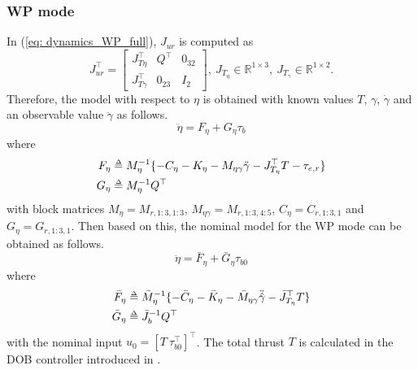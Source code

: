 \documentclass[letterpaper, 10 pt, conference]{ieeeconf}  %
\def\delequal{\mathrel{\ensurestackMath{\stackon[1pt]{=}{\scriptscriptstyle\Delta}}}}
\theoremstyle{definition}
\begin{document}
\subsubsection{WP mode}
In (\ref{eq: dynamics_WP_full}), $J_{u r}$ is computed as
\begin{equation}
    J_{u r}^{\top} = \begin{bmatrix} J_{T \eta}^{\top} & Q^{\top} & 0_{3 2} \\ J_{T \gamma}^{\top} & 0_{2 3} & I_2 \end{bmatrix}, \ J_{T_{\eta}} \in \mathbb{R}^{1 \times 3}, \ J_{T_{\gamma}} \in \mathbb{R}^{1 \times 2}.
\end{equation}
Therefore, the model with respect to $\eta$ is obtained with {known values $T$, $\gamma$, $\dot{\gamma}$ and an observable value $\ddot{\gamma}$} as follows.
\begin{equation} \label{eq: actual model of WP mode}
    \ddot{\eta} = F_{\eta} + G_{\eta}\tau_b
\end{equation}
where
\begin{equation*}
\begin{split}
    F_{\eta} &\delequal M^{-1}_{\eta}\{ -C_{\eta} - K_{\eta} - M_{\eta \gamma}\ddot{\gamma} - J^{\top}_{T_{\eta}}T - \tau_{e,r} \} \\
    G_{\eta} &\delequal M^{-1}_{\eta}Q^{\top}
\end{split}
\end{equation*}
with block matrices $M_{\eta} = M_{r,1:3,1:3}$, $M_{\eta \gamma} = M_{r,1:3,4:5}$, $C_{\eta} = C_{r, 1:3,1}$ and $G_{\eta} = G_{r, 1:3, 1}$.
Then based on this, the nominal model for the WP mode can be obtained as follows.
\begin{equation} \label{eq: nominal dynamics of WP mode}
    \ddot{\eta} = \bar{F}_{\eta} + \bar{G}_{\eta}\tau_{b 0}
\end{equation}
where
\begin{equation} \label{eq: definition of F_eta and G_eta}
    \begin{split}
        \bar{F}_{\eta} &\delequal \bar{M}^{-1}_{\eta}\{ -\bar{C}_{\eta} - \bar{K}_{\eta} - \bar{M}_{\eta \gamma}\ddot{\hat{\gamma}} - \bar{J}^{\top}_{T_{\eta}}T \} \\
    \bar{G}_{\eta} &\delequal \bar{J}_b^{-1} Q^{\top}
    \end{split}
\end{equation}
with the nominal input $u_0 = [T \ \tau_{b 0}^{\top}]^{\top}$. The total thrust $T$ is calculated in the DOB controller introduced in \cite{lee2020aerial_2}.
\end{document}
